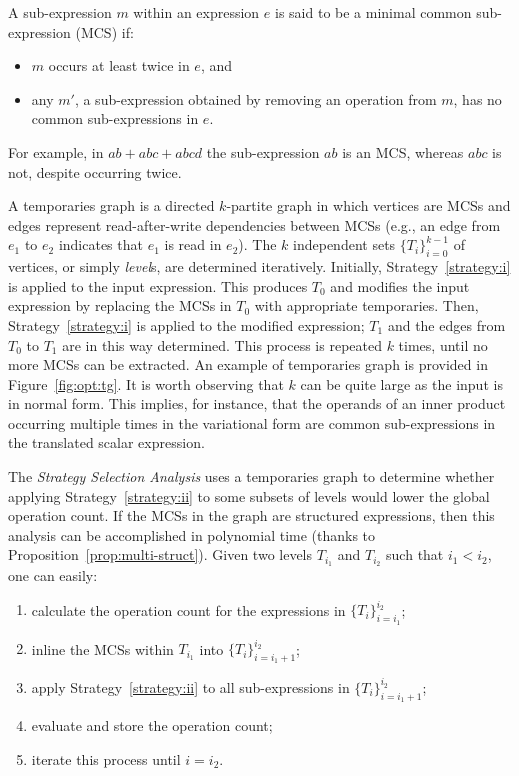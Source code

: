\begin{Def}
A sub-expression $m$ within an expression $e$ is said to be a minimal common sub-expression (MCS) if:
\begin{itemize}
\item $m$ occurs at least twice in $e$, and
\item any $m'$, a sub-expression obtained by removing an operation from $m$, has no common sub-expressions in $e$.
\end{itemize}
\end{Def}

For example, in $a b + a b c + a b c d$ the sub-expression $a b$ is an MCS, whereas $a b c$ is not, despite occurring twice. 

A temporaries graph is a directed $k$-partite graph in which vertices are MCSs and edges represent read-after-write dependencies between MCSs (e.g., an edge from $e_1$ to $e_2$ indicates that $e_1$ is read in $e_2$). The $k$ independent sets $\lbrace T_i \rbrace_{i=0}^{k-1}$ of vertices, or simply {\em level}s, are determined iteratively. Initially, Strategy~\ref{strategy:i} is applied to the input expression. This produces $T_0$ and modifies the input expression by replacing the MCSs in $T_0$ with appropriate temporaries. Then, Strategy~\ref{strategy:i} is applied to the modified expression; $T_1$ and the edges from $T_0$ to $T_1$ are in this way determined. This process is repeated $k$ times, until no more MCSs can be extracted. An example of temporaries graph is provided in Figure~\ref{fig:opt:tg}. It is worth observing that $k$ can be quite large as the input is in normal form. This implies, for instance, that the operands of an inner product occurring multiple times in the variational form are common sub-expressions in the translated scalar expression.

The {\em Strategy Selection Analysis} uses a temporaries graph to determine whether applying Strategy~\ref{strategy:ii} to some subsets of levels would lower the global operation count. If the MCSs in the graph are structured expressions, then this analysis can be accomplished in polynomial time (thanks to Proposition~\ref{prop:multi-struct}). Given two levels $T_{i_1}$ and $T_{i_2}$ such that $i_1 < i_2$, one can easily:

\begin{enumerate}
\item calculate the operation count for the expressions in $\lbrace T_i \rbrace_{i=i_1}^{i_2}$;
\item inline the MCSs within $T_{i_1}$ into $\lbrace T_i \rbrace_{i=i_1 + 1}^{i_2}$;
\item apply Strategy~\ref{strategy:ii} to all sub-expressions in $\lbrace T_i \rbrace_{i=i_1 + 1}^{i_2}$;
\item evaluate and store the operation count;
\item iterate this process until $i=i_2$.
\end{enumerate}

